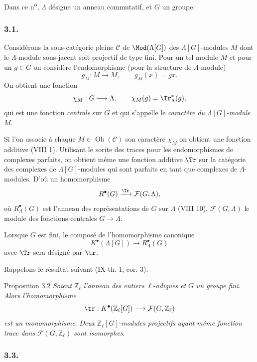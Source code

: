 Dans ce n\textsuperscript{o}, $\Lambda$ désigne un anneau commutatif, et $G$ un groupe.

\subsubsection*{3.1.}

Considérons la sous-catégorie pleine $\mathcal{C}$ de $\Mod(\Lambda[G])$ des $\Lambda[G]$-modules $M$ dont le $\Lambda$-module sous-jacent soit projectif de type fini. Pour un tel module $M$ et pour un $g\in G$ on considère l'endomorphisme (pour la structure de $\Lambda$-module)
\[
g_M:M\longrightarrow M,
\qquad g_M(x)=gx.
\]
On obtient une fonction
\[
\chi_M:G\longrightarrow \Lambda,
\qquad \chi_M(g)=\Tr^*_\Lambda(g),
\]
qui est une fonction \emph{centrale} sur $G$ et qui s'appelle le \emph{caractère du} $\Lambda[G]$-\emph{module} $M$.

Si l'on associe à chaque $M\in\operatorname{Ob}(\mathcal{C})$ son caractère $\chi_M$ on obtient une fonction additive (VIII 1). Utilisant le sorite des traces pour les endomorphismes de complexes parfaits, on obtient même une fonction additive $\Tr$ sur la catégorie des complexes de $\Lambda[G]$-modules qui sont parfaits en tant que complexes de $\Lambda$-modules. D'où un homomorphisme
\[
R^{\bullet}(G)\xrightarrow{\Tr}\mathcal{F}(G,\Lambda),
\]
où $R^{\bullet}_{\Lambda}(G)$ est l'anneau des représentations de $G$ sur $\Lambda$ (VIII 10), $\mathcal{F}(G,\Lambda)$ le module des fonctions centrales $G\to\Lambda$.

Lorsque $G$ est fini, le composé de l'homomorphisme canonique
\[
K^{\bullet}(\Lambda[G])\longrightarrow R^{\bullet}_{\Lambda}(G)
\]
avec $\Tr$ sera désigné par $\tr$.

Rappelons le résultat suivant (IX th. 1, cor. 3):

\begin{statement}{Proposition 3.2}
\emph{Soient} $\mathbb{Z}_\ell$ \emph{l'anneau des entiers} $\ell$-\emph{adiques et} $G$ \emph{un groupe fini}. \emph{Alors l'homomorphisme}
\[
\tr:K^{\bullet}(\mathbb{Z}_\ell[G])\longrightarrow \mathcal{F}(G,\mathbb{Z}_\ell)
\]
\emph{est un monomorphisme}. \emph{Deux} $\mathbb{Z}_\ell[G]$-\emph{modules projectifs ayant même fonction trace dans} $\mathcal{F}(G,\mathbb{Z}_\ell)$ \emph{sont isomorphes}.
\end{statement}

\subsubsection*{3.3.}

